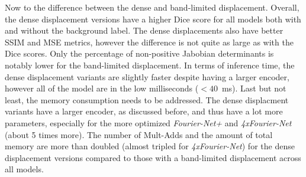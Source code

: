 Now to the difference between the dense and band-limited displacement. Overall, the dense displacement versions have a higher Dice score for all models both with and without the background label. 
The dense displacements also have better SSIM and MSE metrics, however the difference is not quite as large as with the Dice scores. 
Only the percentage of non-positive Jabobian determinants is notably lower for the band-limited displacement. 
In terms of inference time, the dense displacement variants are slightly faster despite having a larger encoder, however all of the model are in the low milliseconds ($<40$~ms). Last but not least, the memory consumption needs to be addressed. The dense displacment variants have a larger encoder, as discussed before, and thus have a lot more parameters, especially for the more optimized \emph{Fourier-Net+} and \emph{4xFourier-Net} (about 5 times more). The number of Mult-Adds and the amount of total memory are more than doubled (almost tripled for \emph{4xFourier-Net}) for the dense displacement versions compared to those with a band-limited displacement across all models.

